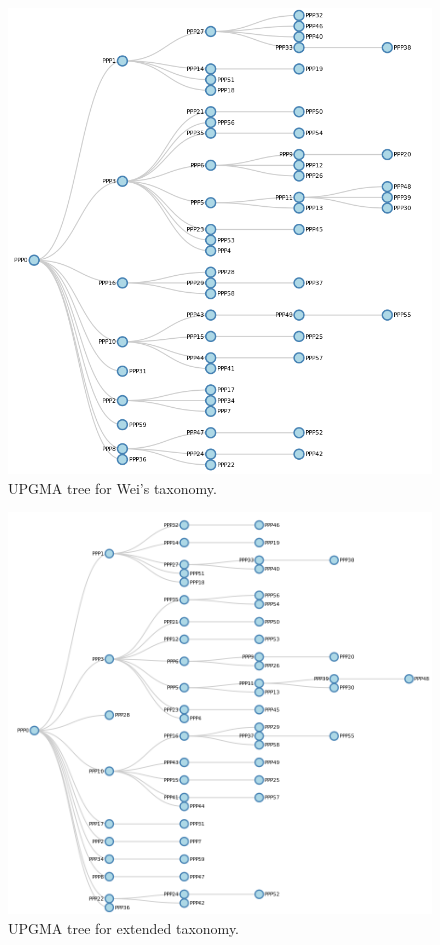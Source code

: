 \documentclass[authoryearcitations]{UoYCSproject}
\begin{document}
\begin{figure}
\graphicspath{ {EvalPics/} }
\includegraphics[scale=0.5]{wei_tree.png}
\caption{UPGMA tree for Wei's taxonomy.}
\label{fig:wei_tree}
\end{figure}

\begin{figure}
\graphicspath{ {EvalPics/} }
\includegraphics[scale=0.5]{new_tree.png}
\caption{UPGMA tree for extended taxonomy.}
\label{fig:new_tree}
\end{figure}
\end{document}
